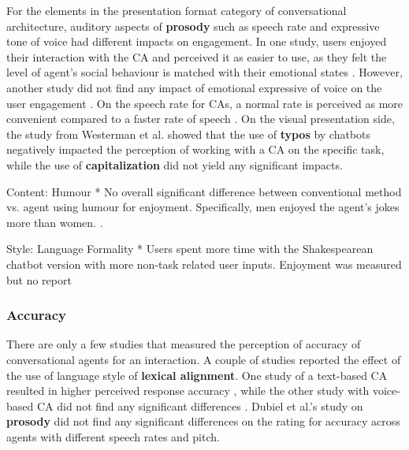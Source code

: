 \documentclass[sigconf,screen,review, anonymous]{acmart}
\newcommand{\cmt}[1]{}%
\begin{document}
For the elements in the presentation format category of conversational architecture, auditory aspects of \textbf{prosody} such as speech rate and expressive tone of voice had different impacts on engagement. In one study, users enjoyed their interaction with the CA and perceived it as easier to use, as they felt the level of agent's social behaviour is matched with their emotional states \cite{kim2020can}\cmt{[24]}. However, another study did not find any impact of emotional expressive of voice on the user engagement \cite{zhu2022effects}\cmt{[26]}. On the speech rate for CAs, a normal rate is perceived as more convenient compared to a faster rate of speech \cite{choi2020nobody}\cmt{[54]}. On the visual presentation side, the study from Westerman et al. \cite{westerman2019believe}\cmt{[9]} showed that the use of \textbf{typos} by chatbots negatively impacted the perception of working with a CA on the specific task, while the use of \textbf{capitalization} did not yield any significant impacts.

Content: Humour
* No overall significant difference between conventional method vs. agent using humour for enjoyment. Specifically, men enjoyed the agent's jokes more than women.  \cite{miyamoto2017improving}\cmt{[46]}.

Style: Language Formality
* Users spent more time with the Shakespearean chatbot version with more non-task related user inputs. Enjoyment was measured but no report \cite{elsholz2019exploring}\cmt{[61]}

\subsubsection{Accuracy}
There are only a few studies that measured the perception of accuracy of conversational agents for an interaction. A couple of studies reported the effect of the use of language style of \textbf{lexical alignment}. One study of a text-based CA resulted in higher perceived response accuracy \cite{huiyang2022improving}\cmt{[17]}, while the other study with voice-based CA did not find any significant differences \cite{linnemann2018can}\cmt{[15]}. Dubiel et al.'s study \cite{dubiel2020persuasive}\cmt{[60]} on \textbf{prosody} did not find any significant differences on the rating for accuracy across agents with different speech rates and pitch.

\end{document}
